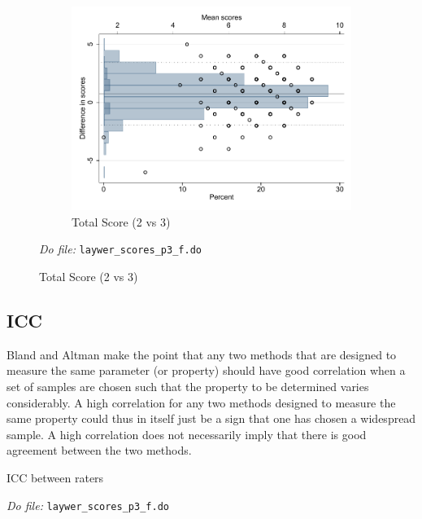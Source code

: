 \documentclass[oneside,11pt]{article}
\begin{document}
\begin{figure}[H]
\begin{center}
\begin{subfigure}{0.5\textwidth}
        \caption{Total Score (2 vs 3)}
        \centering
        \includegraphics[width=\textwidth]{Figuras/bland_altman_total_23.pdf}
    \end{subfigure}
    
    \end{center}
    \scriptsize{ \noindent 
    \textit{Do file: }  \texttt{laywer\_scores\_p3\_f.do}}

\end{figure}


\subsection{ICC}

Bland and Altman make the point that any two methods that are designed to measure the same parameter (or property) should have good correlation when a set of samples are chosen such that the property to be determined varies considerably. A high correlation for any two methods designed to measure the same property could thus in itself just be a sign that one has chosen a widespread sample. A high correlation does not necessarily imply that there is good agreement between the two methods.


\begin{table}[H]
    \caption{ICC between raters}
    \label{icc_cor}
    \begin{center}
    \scriptsize{}
    \end{center}
  \scriptsize{ \noindent 
    \textit{Do file: }  \texttt{laywer\_scores\_p3\_f.do}}
\end{table}
\end{document}
